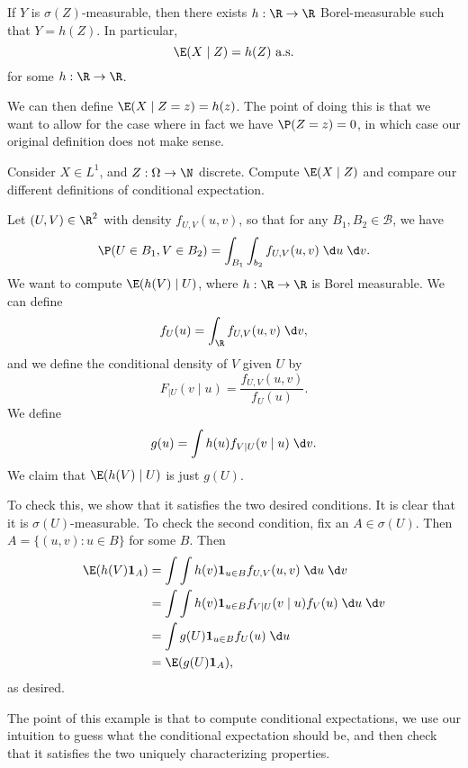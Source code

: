 \documentclass[a4paper]{article}
\begin{document}
\begin{lemma}
  If $Y$ is $\sigma(Z)$-measurable, then there exists $h: \R \to \R$ Borel-measurable such that $Y = h(Z)$. In particular,
  \[
    \E(X \mid Z) = h(Z) \text{ a.s.}
  \]
  for some $h: \R \to \R$.
\end{lemma}
We can then define $\E(X \mid Z = z) = h(z)$. The point of doing this is that we want to allow for the case where in fact we have $\P(Z = z) = 0$, in which case our original definition does not make sense.

\begin{ex}
  Consider $X \in L^1$, and $Z: \Omega \to \N$ discrete. Compute $\E(X \mid Z)$ and compare our different definitions of conditional expectation.
\end{ex}

\begin{eg}
  Let $(U, V) \in \R^2$ with density $f_{U, V}(u, v)$, so that for any $B_1, B_2 \in \mathcal{B}$, we have
  \[
    \P(U \in B_1, V \in B_2) = \int_{B_1} \int_{b_2} f_{U, V}(u, v) \;\d u \;\d v.
  \]
  We want to compute $\E(h(V) \mid U)$, where $h: \R \to \R$ is Borel measurable. We can define
  \[
    f_U(u) = \int_\R f_{U, V} (u, v) \;\d v,
  \]
  and we define the conditional density of $V$ given $U$ by
  \[
    F_{ \mid U} (v \mid u) = \frac{f_{U, V}(u, v)}{f_U(u)}.
  \]
  We define
  \[
    g(u) = \int h(u) f_{V \mid U} (v \mid u)\;\d v.
  \]
  We claim that $\E(h(V) \mid U)$ is just $g(U)$.

  To check this, we show that it satisfies the two desired conditions. It is clear that it is $\sigma(U)$-measurable. To check the second condition, fix an $A \in \sigma(U)$. Then $A = \{(u, v): u \in B\}$ for some $B$. Then
  \begin{align*}
    \E(h(V) \mathbf{1}_A) &= \int \int h(v) \mathbf{1}_{u \in B} f_{U, V} (u, v)\;\d u\;\d v\\
    &= \int \int h(v) \mathbf{1}_{u \in B} f_{V \mid U}(v \mid u) f_V(u)\;\d u\;\d v\\
    &= \int g(U) \mathbf{1}_{u \in B} f_U(u) \;\d u\\
    &= \E(g(U) \mathbf{1}_A),
  \end{align*}
  as desired.
\end{eg}
The point of this example is that to compute conditional expectations, we use our intuition to guess what the conditional expectation should be, and then check that it satisfies the two uniquely characterizing properties.
\end{document}
